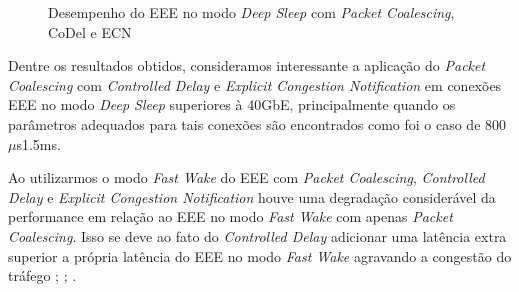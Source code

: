 \begin{figure}[!htb]
    \hfill
    
    \caption{\centering Desempenho do EEE no modo \emph{Deep Sleep} com \emph{Packet Coalescing}, CoDel e ECN}
\end{figure}

Dentre os resultados obtidos, consideramos interessante a aplicação do \emph{Packet Coalescing} com \emph{Controlled Delay} e \emph{Explicit Congestion Notification} em conexões EEE no modo \emph{Deep Sleep} superiores à 40GbE, principalmente quando os parâmetros adequados para tais conexões são encontrados como foi o caso de 800$\mu$s1.5ms.

Ao utilizarmos o modo \emph{Fast Wake} do EEE com \emph{Packet Coalescing}, \emph{Controlled Delay} e \emph{Explicit Congestion Notification} houve uma degradação considerável da performance em relação ao EEE no modo \emph{Fast Wake} com apenas \emph{Packet Coalescing}. Isso se deve ao fato do \emph{Controlled Delay} adicionar uma latência extra superior a própria latência do EEE no modo \emph{Fast Wake} agravando a congestão do tráfego \cite{silva2018eon}; \cite{silva2016controlling}; \cite{e2019tcp}.

